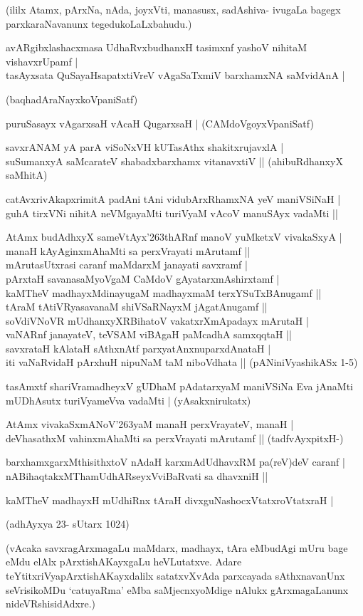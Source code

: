 \noindent
(ililx Atamx, pArxNa, nAda, joyxVti, manasusx, sadAshiva- ivugaLa bagegx parxkaraNavanunx tegedukoLaLxbahudu.)
\begin{itemize}
{\bf 
\item[58.] avARgibxlashacxmasa UdhaRvxbudhanxH tasimxnf yashoV nihitaM vishavxrUpamf |\\\label{152c}
tasAyxsata QuSayaHsapatxtiVreV vAgaSaTxmiV barxhamxNA saMvidAnA |

\hfill{(baqhadAraNayxkoVpaniSatf)}
\item[59.] puruSasayx vAgarxsaH vAcaH QugarxsaH |\label{152d}
\hfill{(CAMdoVgoyxVpaniSatf)}
\item[60.] savxrANAM yA parA viSoNxVH kUTasAthx shakitxrujavxlA |\\\label{152e}
suSumanxyA saMcarateV shabadxbarxhamx vitanavxtiV ||
\hfill{(ahibuRdhanxyX saMhitA)}
\item[61.] catAvxrivAkapxrimitA padAni tAni vidubArxRhamxNA yeV maniVSiNaH |\\\label{152f}
guhA tirxVNi nihitA neVMgayaMti turiVyaM vAcoV manuSAyx vadaMti ||
\item[62.] AtAmx budAdhxyX sameVtAyx\char'263thARnf manoV yuMketxV vivakaSxyA |\\\label{152g}
manaH kAyAginxmAhaMti sa perxVrayati mArutamf ||\\
mArutasUtxrasi caranf maMdarxM janayati savxramf |\\
pArxtaH savanasaMyoVgaM CaMdoV gAyatarxmAshirxtamf |\\
kaMTheV madhayxMdinayugaM madhayxmaM terxYSuTxBAnugamf ||\\
tAraM tAtiVRyasavanaM shiVSaRNayxM jAgatAnugamf ||\\
soVdiVNoVR mUdhanxyXRBihatoV vakatxrXmApadayx mArutaH |\\
vaNARnf janayateV, teVSAM viBAgaH paMcadhA samxqqtaH ||\\
savxrataH kAlataH sAthxnAtf parxyatAnxnuparxdAnataH |\\
iti vaNaRvidaH pArxhuH nipuNaM taM niboVdhata ||
\hfill{(pANiniVyashikASx 1-5)}
\item[63.] tasAmxtf shariVramadheyxV gUDhaM pAdatarxyaM maniVSiNa Eva jAnaMti \\\label{153}
mUDhAsutx turiVyameVva vadaMti |
\hfill{(yAsakxnirukatx)}
\item[64.] AtAmx vivakaSxmANoV\char'263yaM manaH perxVrayateV, manaH |\\\label{153a}
deVhasathxM vahinxmAhaMti sa perxVrayati mArutamf ||
\hfill{(tadfvAyxpitxH-)}
\item[65.] barxhamxgarxMthisithxtoV nAdaH karxmAdUdhavxRM pa(reV)deV caranf |\\
nABihaqtakxMThamUdhARseyxVviBaRvati sa dhavxniH ||
\item[66.] kaMTheV madhayxH mUdhiRnx tAraH divxguNashocxVtatxroVtatxraH |\label{153b}

\hfill (adhAyxya 23- sUtarx 1024)
}
\end{itemize}
(vAcaka savxragArxmagaLu maMdarx, madhayx, tAra eMbudAgi mUru bage eMdu elAlx pArxtishAKayxgaLu heVLutatxve. Adare teYtitxriVyapArxtishAKayxdalilx satatxvXvAda parxcayada sAthxnavanUnx seVrisikoMDu `catuyaRma' eMba saMjecnxyoMdige nAlukx gArxmagaLanunx nideVRshisidAdxre.) 

